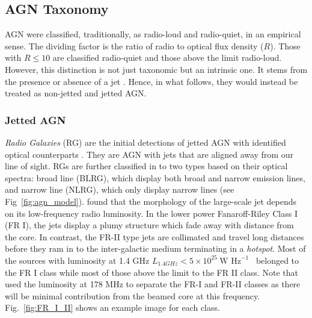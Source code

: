  \subsection{AGN Taxonomy \label{sec:taxonomy}}
AGN were classified, traditionally, as radio-loud and radio-quiet, in an empirical sense. The dividing factor is the ratio of radio to optical flux density ($R$). Those with $R\leq10$ are classified radio-quiet and those above the limit radio-loud. However, this distinction is not just taxonomic but an intrinsic one. It stems from the presence or absence of a jet \citep{Padovani_2017}. Hence, in what follows, they would instead be treated as non-jetted and jetted AGN.
\subsubsection{Jetted AGN}
\textit{Radio Galaxies} (RG) are the initial detections of jetted AGN with identified optical counterparts \citep[e.g.,][]{1954ApJ...119..215B}. They are AGN with jets that are aligned away from our line of sight. RGs are further classified in to two types based on their optical spectra: broad line (BLRG), which display both broad and narrow emission lines, and narrow line (NLRG), which only display narrow lines  (see Fig~\ref{fig:agn_model}).  \citet{fanaroff1974morphology} found that the morphology of the large-scale jet depends on its low-frequency radio luminosity. In the lower power Fanaroff-Riley Class I (FR I), the jets display a plumy structure which fade away with distance from the core. In contrast, the FR-II type jets are collimated and travel long distances before they ram in to the inter-galactic medium terminating in a \textit{hotspot}. Most of the sources with luminosity at 1.4 GHz $L_{1.4GHz}<5\times10^{25}~\textrm{W Hz}^{-1}$~
belonged to the FR I class while most of those above the limit to the FR II class. Note that \citet{fanaroff1974morphology} used the luminosity at 178 MHz to separate the FR-I and FR-II classes as there will be minimal contribution from the beamed core at this frequency.  Fig.~\ref{fig:FR_I_II} shows an example image for each class.

